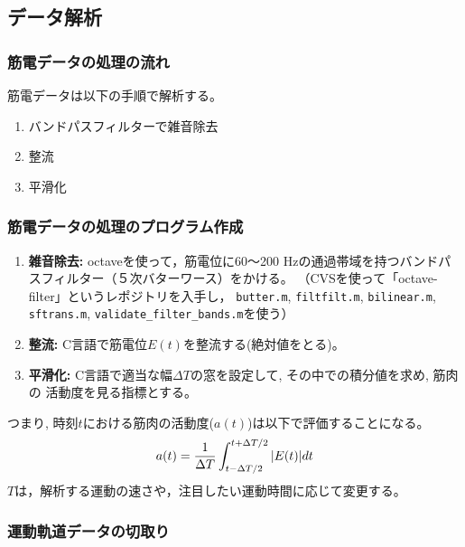 \documentclass{jarticle}
\begin{document}
\subsection{データ解析}
\subsubsection{筋電データの処理の流れ}
筋電データは以下の手順で解析する。
\begin{enumerate}
\item バンドパスフィルターで雑音除去
\item 整流
\item 平滑化
\end{enumerate}

\subsubsection{筋電データの処理のプログラム作成}
\begin{enumerate}
\item \textbf{雑音除去: } octaveを使って，筋電位に60〜200 Hzの通過帯域を持つバンドパスフィルター（５次バターワース）をかける。
  （CVSを使って「octave-filter」というレポジトリを入手し，
  \verb|butter.m|, \verb|filtfilt.m|, \verb|bilinear.m|, \verb|sftrans.m|, 
  \verb|validate_filter_bands.m|を使う）
\item \textbf{整流: } C言語で筋電位$E(t)$を整流する(絶対値をとる)。
\item \textbf{平滑化: } C言語で適当な幅$\Delta T$の窓を設定して, その中での積分値を求め, 筋肉の
  活動度を見る指標とする。
\end{enumerate}
つまり, 時刻$t$における筋肉の活動度($a(t)$)は以下で評価することになる。
\begin{align}
  a(t)=\frac{1}{\Delta T}\int_{t-\Delta T/2}^{t+\Delta T/2}|E(t)|dt\notag
\end{align}
$T$は，解析する運動の速さや，注目したい運動時間に応じて変更する。

\subsubsection{運動軌道データの切取り}
\end{document}
